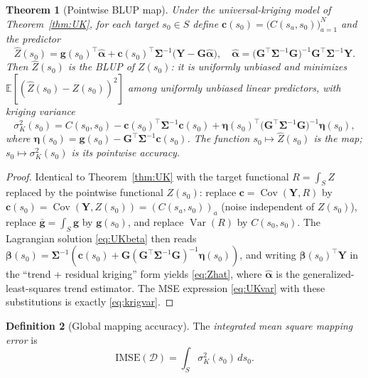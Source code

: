 \documentclass{amsart}
\newtheorem{theorem}{Theorem}
\theoremstyle{definition}
\newtheorem{definition}[theorem]{Definition}
\newcommand{\E}{\mathbb{E}}
\newcommand{\Var}{\operatorname{Var}}
\newcommand{\Cov}{\operatorname{Cov}}
\newcommand{\Zhat}{\widehat Z}
\begin{document}
\begin{theorem}[Pointwise BLUP map]\label{thm:map}
Under the universal-kriging model of Theorem~\ref{thm:UK}, for each target
$s_0\in S$ define
$\mathbf c(s_0)=\big(C(s_a,s_0)\big)_{a=1}^N$ and the predictor
\begin{equation}\label{eq:Zhat}
\Zhat(s_0)=\mathbf g(s_0)^\top\widehat{\boldsymbol\alpha}
+\mathbf c(s_0)^\top\boldsymbol\Sigma^{-1}
\big(\mathbf Y-\mathbf G\widehat{\boldsymbol\alpha}\big),
\quad
\widehat{\boldsymbol\alpha}
=\big(\mathbf G^\top\boldsymbol\Sigma^{-1}\mathbf G\big)^{-1}
\mathbf G^\top\boldsymbol\Sigma^{-1}\mathbf Y .
\end{equation}
Then $\Zhat(s_0)$ is the BLUP of $Z(s_0)$: it is uniformly unbiased and
minimizes $\E[(\Zhat(s_0)-Z(s_0))^2]$ among uniformly unbiased linear
predictors, with \emph{kriging variance}
\begin{equation}\label{eq:krigvar}
\sigma_K^2(s_0)=C(s_0,s_0)-\mathbf c(s_0)^\top\boldsymbol\Sigma^{-1}
\mathbf c(s_0)
+\boldsymbol\eta(s_0)^\top\big(\mathbf G^\top\boldsymbol\Sigma^{-1}
\mathbf G\big)^{-1}\boldsymbol\eta(s_0),
\end{equation}
where $\boldsymbol\eta(s_0)=\mathbf g(s_0)
-\mathbf G^\top\boldsymbol\Sigma^{-1}\mathbf c(s_0)$. The function
$s_0\mapsto\Zhat(s_0)$ is the \emph{map}; $s_0\mapsto\sigma_K^2(s_0)$ is
its pointwise accuracy.
\end{theorem}
\begin{proof}
Identical to Theorem~\ref{thm:UK} with the target functional $R=\int_S Z$
replaced by the pointwise functional $Z(s_0)$: replace
$\mathbf c=\Cov(\mathbf Y,R)$ by $\mathbf c(s_0)=\Cov(\mathbf
Y,Z(s_0))=(C(s_a,s_0))_a$ (noise independent of $Z(s_0)$), replace
$\bar{\mathbf g}=\int_S\mathbf g$ by $\mathbf g(s_0)$, and replace
$\Var(R)$ by $C(s_0,s_0)$. The Lagrangian solution \eqref{eq:UKbeta} then
reads $\boldsymbol\beta(s_0)=\boldsymbol\Sigma^{-1}(\mathbf c(s_0)+\mathbf
G(\mathbf G^\top\boldsymbol\Sigma^{-1}\mathbf G)^{-1}\boldsymbol\eta(s_0))$,
and writing $\boldsymbol\beta(s_0)^\top\mathbf Y$ in the
``trend + residual kriging'' form yields \eqref{eq:Zhat}, where
$\widehat{\boldsymbol\alpha}$ is the generalized-least-squares trend
estimator. The MSE expression \eqref{eq:UKvar} with these substitutions is
exactly \eqref{eq:krigvar}.
\end{proof}

\begin{definition}[Global mapping accuracy]
The \emph{integrated mean square mapping error} is
\begin{equation}\label{eq:IMSE}
\mathrm{IMSE}(\mathcal D)=\int_S \sigma_K^2(s_0)\,ds_0 .
\end{equation}
\end{definition}
\end{document}
